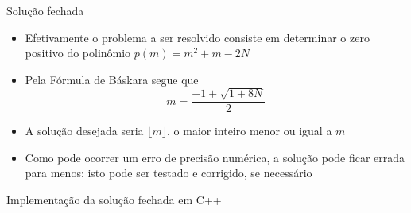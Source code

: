 \begin{frame}[fragile]{Solução fechada}

    \begin{itemize}
        \item Efetivamente o problema a ser resolvido consiste em determinar o zero positivo do polinômio $p(m) = m^2 + m - 2N$

        \item Pela Fórmula de Báskara segue que
$$m = \frac{-1 + \sqrt{1 + 8N}}{2}$$

        \item A solução desejada seria $\lfloor{m}\rfloor$, o maior inteiro menor ou igual a $m$

        \item Como pode ocorrer um erro de precisão numérica, a solução pode ficar errada para menos: isto pode ser testado e corrigido, se necessário
    \end{itemize}

\end{frame}

\begin{frame}[fragile]{Implementação da solução fechada em C++}


\end{frame}
